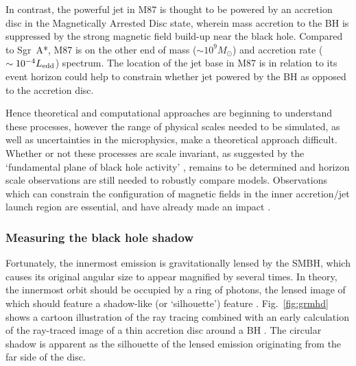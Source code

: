 In contrast, the powerful jet in M87 is thought to be powered by an accretion disc in the Magnetically Arrested Disc \citep[(MAD),][]{Narayan_2003} state, wherein mass accretion to the BH is suppressed by the strong magnetic field build-up near the black hole. Compared to Sgr~A*, M87 is on the other end of mass ($\sim 10^9 M_\odot$) and accretion rate ($\sim 10^{-4} L_{\rm edd}$) spectrum. The location of the jet base in M87 is in relation to its event horizon could help to constrain whether jet powered by the BH as opposed to the accretion disc.


Hence theoretical and computational approaches are beginning to understand these processes, however the range of physical scales needed to be simulated, as well as uncertainties in the microphysics, make a theoretical approach difficult. Whether or not these processes are scale invariant, as suggested by the `fundamental plane of black hole activity' \citep{Merloni_2003}, remains to be determined and horizon scale observations are still needed to robustly compare models. Observations which can constrain the configuration of magnetic fields in the inner accretion/jet launch region are essential, and have already made an impact \citep{Johnson_2015b}.

\subsubsection{Measuring the black hole shadow}

Fortunately, the innermost emission is gravitationally lensed by the SMBH, which causes its original angular size to appear magnified by several times. In theory, the innermost orbit should be occupied by a ring of photons, the lensed image of which should feature a shadow-like (or `silhouette') feature \citep{Bardeen_1973,Luminet_1979, Falcke_2000,Takahashi_2004, Johannsen_2010}. Fig.~\ref{fig:grmhd} shows a cartoon illustration of the ray tracing combined with an early calculation of the ray-traced image of a thin accretion disc around a BH \citep{Luminet_1979}. The circular shadow is apparent as the silhouette of the lensed emission originating from the far side of the disc. 



